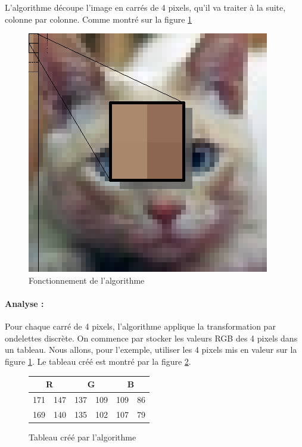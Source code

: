 \documentclass{article}
\begin{document}
L'algorithme découpe l'image en carrés de 4 pixels, qu'il va traiter à la suite, colonne par colonne. Comme montré sur la figure \ref{algo}

\begin{figure}[!h]
\centering
\includegraphics[scale=0.8]{minichat.jpg}
\caption{Fonctionnement de l'algorithme}
\label{algo}
\end{figure}

\paragraph{Analyse :}

Pour chaque carré de 4 pixels, l'algorithme applique la transformation par ondelettes discrète. On commence par stocker les valeurs RGB des 4 pixels dans un tableau. Nous allons, pour l'exemple, utiliser les 4 pixels mis en valeur sur la figure \ref{algo}. Le tableau créé est montré par la figure \ref{tab1}.

\begin{figure}[!h]
\begin{center}
\begin{tabular}{|c|c|c|c|c|c|}
\hline
\multicolumn{2}{|c|}{R} & \multicolumn{2}{|c|}{G}  & \multicolumn{2}{|c|}{B} \\
\hline
171    & 147   &   137  & 109 &   109  & 86   \\ 
\hline
169    & 140   &   135  & 102 &   107  & 79 \\
\hline
\end{tabular}
\end{center}
\caption{Tableau créé par l'algorithme}
\label{tab1}
\end{figure}
\end{document}
